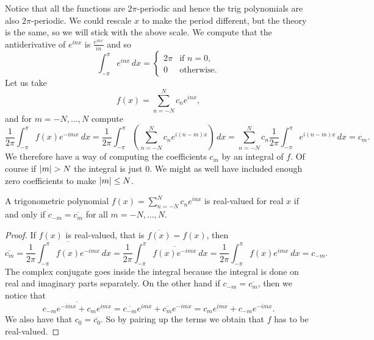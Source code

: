 Notice that all the functions are $2\pi$-periodic and hence the trig
polynomials are also $2\pi$-periodic.
We could rescale $x$ to make the period different, but the theory is the
same, so we will stick with the above scale.
We compute that the antiderivative of $e^{inx}$ is $\frac{e^{inx}}{in}$ and
so
\begin{equation*}
\int_{-\pi}^\pi e^{inx}\,dx =
\begin{cases}
2\pi & \text{if $n=0$,} \\
0 & \text{otherwise.}
\end{cases}
\end{equation*}
Let us take
\begin{equation*}
f(x) = \sum_{n=-N}^N c_n e^{inx} ,
\end{equation*}
and for $m=-N,\ldots,N$ compute
\begin{equation*}
\frac{1}{2\pi} \int_{-\pi}^\pi
f(x) e^{-imx} ~ dx
=
\frac{1}{2\pi} \int_{-\pi}^\pi
\left(\sum_{n=-N}^N c_n e^{i(n-m)x}\right)\,dx
=
\sum_{n=-N}^N
c_n
\frac{1}{2\pi}
\int_{-\pi}^\pi
e^{i(n-m)x}
\,dx
=
c_m .
\end{equation*}
We therefore have a way of computing the coefficients $c_m$ by an integral
of $f$.  Of course if $\lvert {m} \rvert > N$ the integral is just 0.  We might as
well have included enough zero coefficients to make $\lvert {m} \rvert \leq N$.

\begin{prop}
A trigonometric polynomial
$f(x) = \sum_{n=-N}^N c_n e^{inx}$
is real-valued for real $x$ if
and only if $c_{-m} = \overline{c_m}$ for all $m=-N,\ldots,N$.
\end{prop}

\begin{proof}
If $f(x)$ is real-valued, that is $\overline{f(x)} = f(x)$, then
\begin{equation*}
\overline{c_m}
=
\overline{
\frac{1}{2\pi} \int_{-\pi}^\pi
f(x) e^{-imx} ~ dx
}
=
\frac{1}{2\pi} \int_{-\pi}^\pi
\overline{
f(x) e^{-imx} } ~ dx
=
\frac{1}{2\pi} \int_{-\pi}^\pi
f(x) e^{imx} ~ dx
= c_{-m} .
\end{equation*}
The complex conjugate goes inside the integral because the integral is
done on real and imaginary parts separately.  On the other hand if 
$c_{-m} = \overline{c_m}$, then we notice that
\begin{equation*}
\overline{c_{-m} e^{-imx}+ c_{m} e^{imx}}
=
\overline{c_{-m}} e^{imx}+ \overline{c_{m}} e^{-imx}
=
c_{m} e^{imx}+ c_{-m} e^{-imx} .
\end{equation*}
We also have that $c_0 = \overline{c_0}$.
So by pairing up the terms we obtain that $f$ has to be real-valued.
\end{proof}

